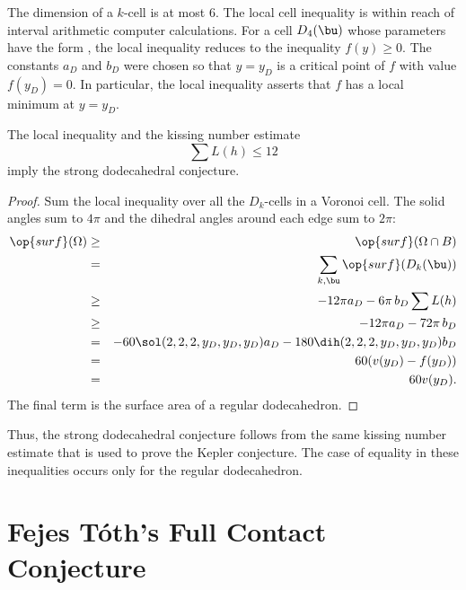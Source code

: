 \begin{remark}
  The dimension of a $k$-cell is at most $6$.  The local cell inequality is
within reach of interval arithmetic computer calculations.  
For a cell $D_4(\bu)$ whose parameters have the
form ,  the local inequality reduces to the inequality $f(y)\ge 0$.  The 
constants $a_D$ and $b_D$ were chosen so that $y=y_D$ is a critical point of $f$ with value
$f(y_D)=0$.  In particular, the local inequality asserts that $f$ has a local minimum at $y=y_D$.
\end{remark}

\begin{lemma}[]
  The local inequality and the kissing number estimate  
\begin{displaymath}
\sum L(h) \le 12
\end{displaymath}
imply the strong dodecahedral conjecture.
\end{lemma}

\begin{proof} 
  Sum the local inequality over all the $D_k$-cells in a Voronoi cell.
  The solid angles sum to $4\pi$ and the dihedral angles around each
  edge sum to $2\pi$:
\begin{eqnarray*}
\op{surf}(\Omega) &\ge& \op{surf}(\Omega\cap B)\\
&=&\sum_{k,\bu} \op{surf}(D_k(\bu))\\
&\ge& -12\pi a_D - 6\pi\, b_D  \sum L(h)\\
&\ge& -12\pi a_D - 72\pi\, b_D\\
&=& -60 \sol(2,2,2,y_D,y_D,y_D) a_D - 180 \dih(2,2,2,y_D,y_D,y_D) b_D\\
&=& 60 (v(y_D) - f(y_D))\\
&=& 60 v(y_D).\\
\end{eqnarray*}
The final term is the surface area of a regular dodecahedron.
\end{proof}

Thus, the strong dodecahedral conjecture follows from the same kissing
number estimate that is used to prove the Kepler conjecture.  The case
of equality in these inequalities occurs only for the regular
dodecahedron.

\newpage
\section{Fejes T\'oth's Full Contact Conjecture}



